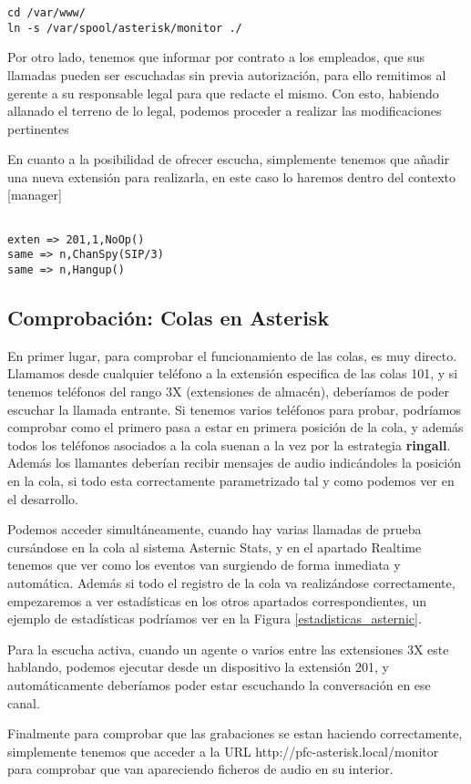 \begin{lstlisting}[style=consola]
cd /var/www/
ln -s /var/spool/asterisk/monitor ./
\end{lstlisting}

Por otro lado, tenemos que informar por contrato a los empleados, que sus llamadas pueden ser escuchadas sin previa autorización, para ello remitimos al gerente a su responsable legal para que redacte el mismo. Con esto, habiendo allanado el terreno de lo legal, podemos proceder a realizar las modificaciones pertinentes

En cuanto a la posibilidad de ofrecer escucha, simplemente tenemos que añadir una nueva extensión para realizarla, en este caso lo haremos dentro del contexto [manager]

\begin{lstlisting}[style=bash,title={/etc/asterisk/extensions.conf}]

exten => 201,1,NoOp()
same => n,ChanSpy(SIP/3)
same => n,Hangup()

\end{lstlisting}

\subsection{Comprobación: Colas en Asterisk}

En primer lugar, para comprobar el funcionamiento de las colas, es muy directo. Llamamos desde cualquier teléfono a la extensión especifica de las colas 101, y si tenemos teléfonos del rango 3X (extensiones de almacén), deberíamos de poder escuchar la llamada entrante. Si tenemos varios teléfonos para probar, podríamos comprobar como el primero pasa a estar en primera posición de la cola, y además todos los teléfonos asociados a la cola suenan a la vez por la estrategia \textbf{ringall}. Además los llamantes deberían recibir mensajes de audio indicándoles la posición en la cola, si todo esta correctamente parametrizado tal y como podemos ver en el desarrollo.

Podemos acceder simultáneamente, cuando hay varias llamadas de prueba cursándose en la cola al sistema Asternic Stats, y en el apartado Realtime tenemos que ver como los eventos van surgiendo de forma inmediata y automática. Además si todo el registro de la cola va realizándose correctamente, empezaremos a ver estadísticas en los otros apartados correspondientes, un ejemplo de estadísticas podríamos ver en la Figura \ref{estadisticas_asternic}.


Para la escucha activa, cuando un agente o varios entre las extensiones 3X este hablando, podemos ejecutar desde un dispositivo la extensión 201, y automáticamente deberíamos poder estar escuchando la conversación en ese canal.

Finalmente para comprobar que las grabaciones se estan haciendo correctamente, simplemente tenemos que acceder a la URL http://pfc-asterisk.local/monitor para comprobar que van apareciendo ficheros de audio en su interior.